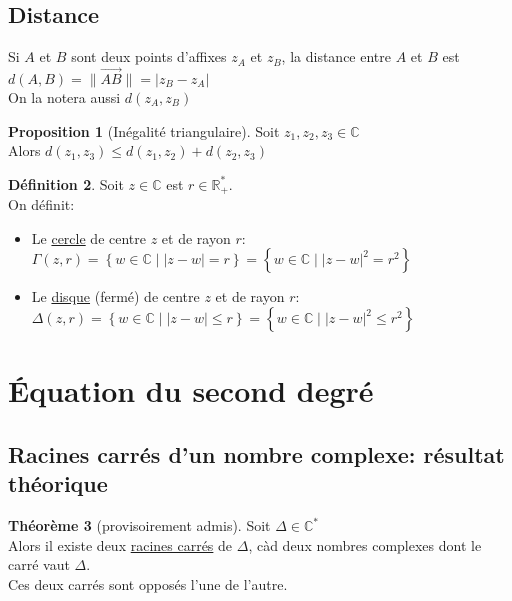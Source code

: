 \documentclass[10pt,a4paper]{article}
\theoremstyle{definition}
\newtheorem{proposition}{Proposition}[section]
\newtheorem{theorem}[proposition]{Théorème}
\newtheorem{definition}[proposition]{Définition}
\begin{document}
\subsection{Distance}
\noindent Si $A$ et $B$ sont deux points d'affixes $z_A$ et $z_B$, la distance entre $A$ et $B$ est $d(A, B) = \lVert \vec{AB} \rVert = \left| z_B - z_A \right|$ \\
On la notera aussi $d(z_A, z_B)$
\begin{proposition}[Inégalité triangulaire]
Soit $z_1, z_2, z_3 \in \mathbb{C}$ \\
Alors $d(z_1, z_3) \leq d(z_1, z_2) + d(z_2, z_3)$
\end{proposition}
\begin{definition}
Soit $z \in \mathbb{C}$ est $r \in \mathbb{R}_+^*$. \\
On définit:
\begin{itemize}
\item Le \uline{cercle} de centre $z$ et de rayon $r$: \\
$\Gamma(z, r) = \left\{ w \in \mathbb{C} \mid \left| z - w \right| = r \right\} =\left\{ w \in \mathbb{C} \mid \left| z - w \right|^2 = r^2 \right\}$
\item Le \uline{disque} (fermé) de centre $z$ et de rayon $r$: \\
$\Delta(z, r) = \left\{ w \in \mathbb{C} \mid \left| z - w \right| \leq r \right\} = \left\{ w \in \mathbb{C} \mid \left| z - w \right|^2 \leq r^2 \right\}$
\end{itemize}
\end{definition}

\section{Équation du second degré}
\subsection{Racines carrés d'un nombre complexe: résultat théorique}
\begin{theorem}[provisoirement admis]
Soit $\Delta \in \mathbb{C}^*$ \\
Alors il existe deux \uline{racines carrés} de $\Delta$, càd deux nombres complexes dont le carré vaut $\Delta$. \\
Ces deux carrés sont opposés l'une de l'autre.
\end{theorem}
\end{document}
